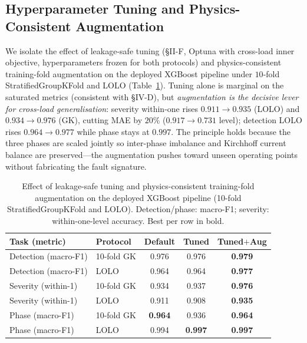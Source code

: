 \documentclass[journal]{IEEEtran}
\begin{document}
\subsection{Hyperparameter Tuning and Physics-Consistent Augmentation}
We isolate the effect of leakage-safe tuning (\S II-F, Optuna with cross-load inner
objective, hyperparameters frozen for both protocols) and physics-consistent training-fold
augmentation on the deployed XGBoost pipeline under $10$-fold StratifiedGroupKFold and
LOLO (Table~\ref{tab:tuneaug}). Tuning alone is marginal on the saturated metrics
(consistent with \S IV-D), but \emph{augmentation is the decisive lever for cross-load
generalisation}: severity within-one rises $0.911\!\rightarrow\!0.935$ (LOLO) and
$0.934\!\rightarrow\!0.976$ (GK), cutting MAE by $20\%$ ($0.917\!\rightarrow\!0.731$
level); detection LOLO rises $0.964\!\rightarrow\!0.977$ while phase stays at $0.997$.
The principle holds because the three phases are scaled jointly so inter-phase imbalance
and Kirchhoff current balance are preserved---the augmentation pushes toward unseen
operating points without fabricating the fault signature.

\begin{table}[!t]
\caption{Effect of leakage-safe tuning and physics-consistent training-fold augmentation on the deployed
XGBoost pipeline (10-fold StratifiedGroupKFold and LOLO). Detection/phase: macro-F1; severity:
within-one-level accuracy. Best per row in bold.}
\label{tab:tuneaug}
\centering
\footnotesize
\begin{tabular}{@{}llccc@{}}
\toprule
Task (metric) & Protocol & Default & Tuned & Tuned$+$Aug \\
\midrule
Detection (macro-F1) & 10-fold GK & 0.976 & 0.976 & \textbf{0.979} \\
Detection (macro-F1) & LOLO       & 0.964 & 0.964 & \textbf{0.977} \\
Severity (within-1)  & 10-fold GK & 0.934 & 0.937 & \textbf{0.976} \\
Severity (within-1)  & LOLO       & 0.911 & 0.908 & \textbf{0.935} \\
Phase (macro-F1)     & 10-fold GK & \textbf{0.964} & 0.936 & \textbf{0.964} \\
Phase (macro-F1)     & LOLO       & 0.994 & \textbf{0.997} & \textbf{0.997} \\
\bottomrule
\end{tabular}
\end{table}
\end{document}
